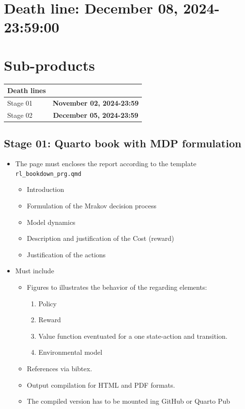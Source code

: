 \documentclass[
  letterpaper,
]{krantz}
\providecommand{\tightlist}{%
  \setlength{\itemsep}{0pt}\setlength{\parskip}{0pt}}\usepackage{longtable,booktabs,array}
\theoremstyle{plain}
\theoremstyle{definition}
\theoremstyle{definition}
\theoremstyle{remark}
\begin{document}
\section{Death line: December 08,
2024-23:59:00}\label{death-line-december-08-2024-235900}

\section{Sub-products}\label{sub-products}

\begin{longtable}[]{@{}lc@{}}
\toprule\noalign{}
\textbf{Death lines} & \\
\midrule\noalign{}
\endhead
\bottomrule\noalign{}
\endlastfoot
Stage 01 & \textbf{November 02, 2024-23:59} \\
Stage 02 & \textbf{December 05, 2024-23:59} \\
\end{longtable}

\subsection{Stage 01: Quarto book with MDP
formulation}\label{stage-01-quarto-book-with-mdp-formulation}

\begin{itemize}
\item
  The page must encloses the report according to the template
  \texttt{rl\_bookdown\_prg.qmd}

  \begin{itemize}
  \tightlist
  \item
    Introduction
  \item
    Formulation of the Mrakov decision process
  \item
    Model dynamics
  \item
    Description and justification of the Cost (reward)
  \item
    Justification of the actions
  \end{itemize}
\item
  Must include

  \begin{itemize}
  \item
    Figures to illustrates the behavior of the regarding elements:

    \begin{enumerate}
    \def\labelenumi{\arabic{enumi}.}
    \tightlist
    \item
      Policy
    \item
      Reward
    \item
      Value function eventuated for a one state-action and transition.
    \item
      Environmental model
    \end{enumerate}
  \item
    References via bibtex.
  \item
    Output compilation for HTML and PDF formats.
  \item
    The compiled version has to be mounted ing GitHub or Quarto Pub
  \end{itemize}
\end{itemize}
\end{document}
